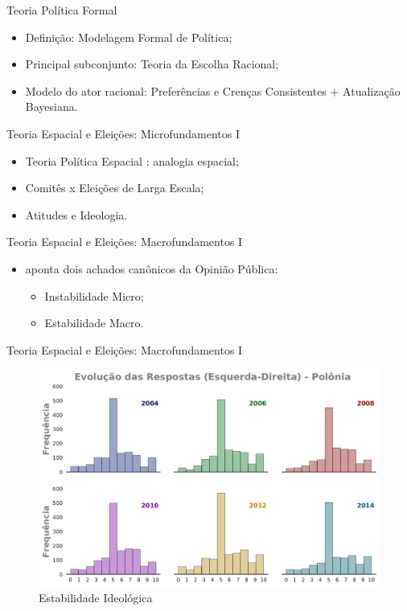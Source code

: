 \documentclass{beamer}
\begin{document}
\begin{frame}{Teoria Política Formal}

  \begin{itemize}
  \item Definição: Modelagem Formal de Política;
  \item Principal subconjunto: Teoria da Escolha Racional;
  \item Modelo do ator racional: Preferências e Crenças Consistentes + Atualização
    Bayesiana.
  \end{itemize}

\end{frame}


\begin{frame}{Teoria Espacial e Eleições: Microfundamentos I}
  \begin{itemize}
  \item Teoria Política Espacial : analogia espacial;
  \item Comitês x Eleições de Larga Escala;
  \item Atitudes e  Ideologia.
  \end{itemize}
\end{frame}

\begin{frame}{Teoria Espacial e Eleições: Macrofundamentos I }
  \begin{itemize}
\item \textcite{druckman2012public} aponta dois achados canônicos da Opinião
  Pública:
  \begin{itemize}
  \item Instabilidade Micro;
  \item Estabilidade Macro.
  \end{itemize}
  \end{itemize}
  
\end{frame}


\begin{frame}{Teoria Espacial e Eleições: Macrofundamentos I }
  \begin{figure}[H]
    \centering
    \includegraphics[scale = 0.4]{ims/ess_Pol_plots.pdf}
    \caption{Estabilidade Ideológica}
    \label{fig1}
  \end{figure}
\end{frame}
\end{document}
